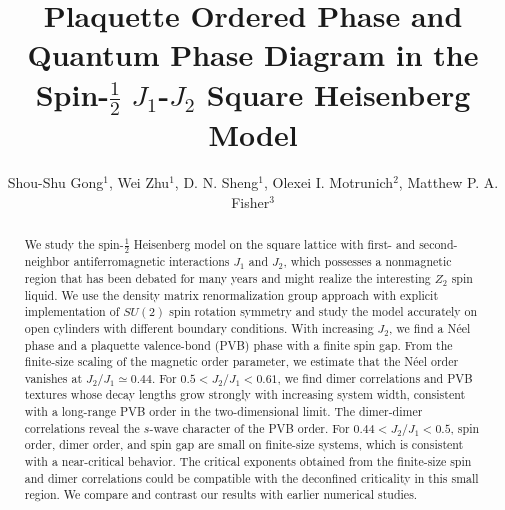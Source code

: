 \documentclass[prl,aps,epsf,showpacs,twocolumn]{revtex4}
\begin{document}
\title{Plaquette Ordered Phase and Quantum Phase Diagram in the Spin-$\frac{1}{2}$ $J_1$-$J_2$ Square Heisenberg Model}
\author{Shou-Shu Gong$^{1}$, Wei Zhu$^{1}$, D. N. Sheng$^{1}$, Olexei I. Motrunich$^{2}$, Matthew P. A. Fisher$^{3}$}

\begin{abstract}
We study the spin-$\frac{1}{2}$ Heisenberg model on the square lattice with first- and second-neighbor antiferromagnetic interactions $J_1$ and $J_2$, which possesses a nonmagnetic region that has been debated for many years and might realize the interesting $Z_2$ spin liquid.
We use the density matrix renormalization group approach with explicit implementation of $SU(2)$ spin rotation symmetry and study the model accurately on open cylinders with different boundary conditions.
With increasing $J_2$, we find a N\'{e}el phase and a plaquette valence-bond (PVB) phase with a finite spin gap.
From the finite-size scaling of the magnetic order parameter, we estimate that the N\'{e}el order vanishes at $J_2/J_1\simeq 0.44$.
For $0.5 < J_2/J_1 < 0.61$, we find dimer correlations and PVB textures whose decay lengths grow strongly with increasing system width, consistent with a long-range PVB order in the two-dimensional limit.  The dimer-dimer correlations reveal the $s$-wave character of the PVB order.
For $0.44 < J_2/J_1 < 0.5$, spin order, dimer order, and spin gap are small on finite-size systems, which is consistent with a near-critical behavior.
The critical exponents obtained from the finite-size spin and dimer correlations could be compatible with the deconfined criticality in this small region.
We compare and contrast our results with earlier numerical studies.
\end{abstract}

\maketitle
\end{document}
